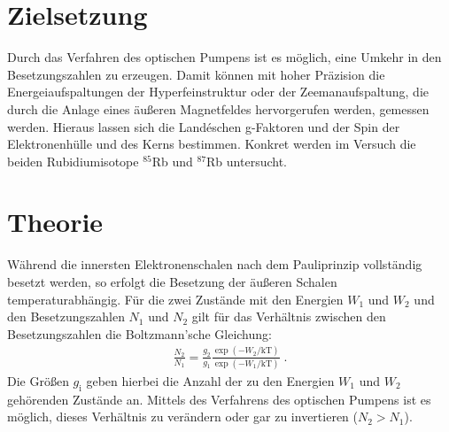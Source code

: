 \section{Zielsetzung}
Durch das Verfahren des optischen Pumpens ist es möglich, eine Umkehr in den Besetzungszahlen
zu erzeugen. Damit können mit hoher Präzision die Energeiaufspaltungen der Hyperfeinstruktur oder
der Zeemanaufspaltung, die durch die Anlage eines äußeren Magnetfeldes hervorgerufen werden,
gemessen werden. Hieraus lassen sich die Landéschen g-Faktoren und der
Spin der Elektronenhülle und des Kerns bestimmen.
Konkret werden im Versuch die beiden Rubidiumisotope $^{85}$Rb und $^{87}$Rb untersucht.

\section{Theorie}
\label{Theorie}
Während die innersten Elektronenschalen nach dem Pauliprinzip vollständig besetzt
werden, so erfolgt die Besetzung der äußeren Schalen temperaturabhängig.
Für die zwei Zustände mit den Energien $W_1$ und $W_2$ und den Besetzungszahlen $N_1$ und
$N_2$ gilt für das Verhältnis zwischen den Besetzungszahlen die Boltzmann'sche Gleichung:
\begin{align*}
    \frac{N_{2}}{N_{1}} = \frac{g_{2}}{g_{1}}\frac{\exp(-W_{2}/\text{kT})}{\exp(-W_{1}/\text{kT})} \; .
\end{align*}
Die Größen $g_{\text{i}}$ geben hierbei die Anzahl der zu den Energien $W_1$ und $W_2$ gehörenden
Zustände an.
Mittels des Verfahrens des optischen Pumpens ist es möglich, dieses Verhältnis zu verändern
oder gar zu invertieren ($N_{2} > N_{1}$).


